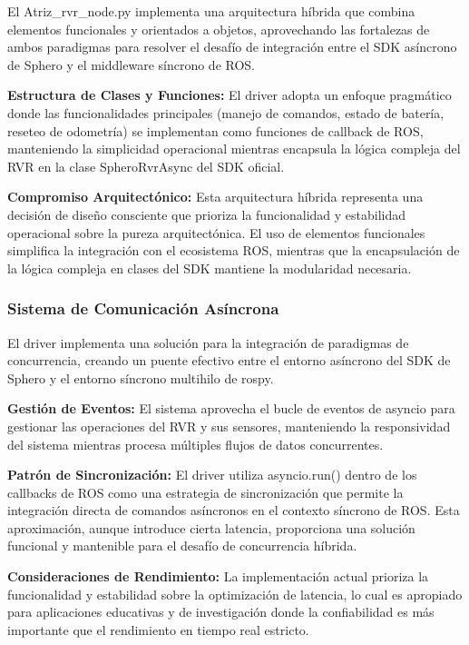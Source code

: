 \documentclass[11pt]{article}
\newcommand{\code}[1]{\textcolor{codeblue}{\url{#1}}}
\numberwithin{figure}{section}
\numberwithin{table}{section}
\def\code#1{#1}%
\begin{document}
El \code{Atriz\_rvr\_node.py} implementa una arquitectura híbrida que combina elementos funcionales y orientados a objetos, aprovechando las fortalezas de ambos paradigmas para resolver el desafío de integración entre el SDK asíncrono de Sphero y el middleware síncrono de ROS.

\textbf{Estructura de Clases y Funciones:} El driver adopta un enfoque pragmático donde las funcionalidades principales (manejo de comandos, estado de batería, reseteo de odometría) se implementan como funciones de callback de ROS, manteniendo la simplicidad operacional mientras encapsula la lógica compleja del RVR en la clase SpheroRvrAsync del SDK oficial.

\textbf{Compromiso Arquitectónico:} Esta arquitectura híbrida representa una decisión de diseño consciente que prioriza la funcionalidad y estabilidad operacional sobre la pureza arquitectónica. El uso de elementos funcionales simplifica la integración con el ecosistema ROS, mientras que la encapsulación de la lógica compleja en clases del SDK mantiene la modularidad necesaria.


\subsubsection{Sistema de Comunicación Asíncrona}

El driver implementa una solución para la integración de paradigmas de concurrencia, creando un puente efectivo entre el entorno asíncrono del SDK de Sphero y el entorno síncrono multihilo de rospy.

\textbf{Gestión de Eventos:} El sistema aprovecha el bucle de eventos de asyncio para gestionar las operaciones del RVR y sus sensores, manteniendo la responsividad del sistema mientras procesa múltiples flujos de datos concurrentes.

\textbf{Patrón de Sincronización:} El driver utiliza asyncio.run() dentro de los callbacks de ROS como una estrategia de sincronización que permite la integración directa de comandos asíncronos en el contexto síncrono de ROS. Esta aproximación, aunque introduce cierta latencia, proporciona una solución funcional y mantenible para el desafío de concurrencia híbrida.

\textbf{Consideraciones de Rendimiento:} La implementación actual prioriza la funcionalidad y estabilidad sobre la optimización de latencia, lo cual es apropiado para aplicaciones educativas y de investigación donde la confiabilidad es más importante que el rendimiento en tiempo real estricto.
\end{document}
